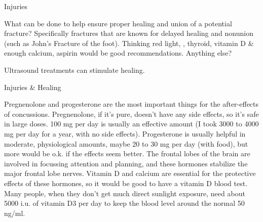 \documentclass[11pt,oneside,openany,extrafontsizes]{memoir}
\begin{document}
\begin{qaexchange}{Injuries}

    \begin{question}
        What can be done to help ensure proper healing and union of a potential fracture? Specifically fractures that are known for delayed healing and nonunion (such as John's Fracture of the foot). Thinking red light, , thyroid, vitamin D \& enough calcium, aspirin would be good recommendations. Anything else?
    \end{question}

    \begin{answer}
      Ultrasound treatments can stimulate healing.
    \end{answer}
\end{qaexchange}

\begin{standalonequote}{Injuries \& Healing}

    \begin{answer}
      Pregnenolone and progesterone are the most important things for the after-effects of concussions. Pregnenolone, if it's pure, doesn't have any side effects, so it's safe in large doses. 100 mg per day is usually an effective amount (I took 3000 to 4000 mg per day for a year, with no side effects). Progesterone is usually helpful in moderate, physiological amounts, maybe 20 to 30 mg per day (with food), but more would be o.k. if the effects seem better. The frontal lobes of the brain are involved in focussing attention and planning, and these hormones stabilize the major frontal lobe nerves. Vitamin D and calcium are essential for the protective effects of these hormones, so it would be good to have a vitamin D blood test. Many people, when they don't get much direct sunlight exposure, need about 5000 i.u. of vitamin D3 per day to keep the blood level around the normal 50 ng/ml.
    \end{answer}
\end{standalonequote}
\end{document}
